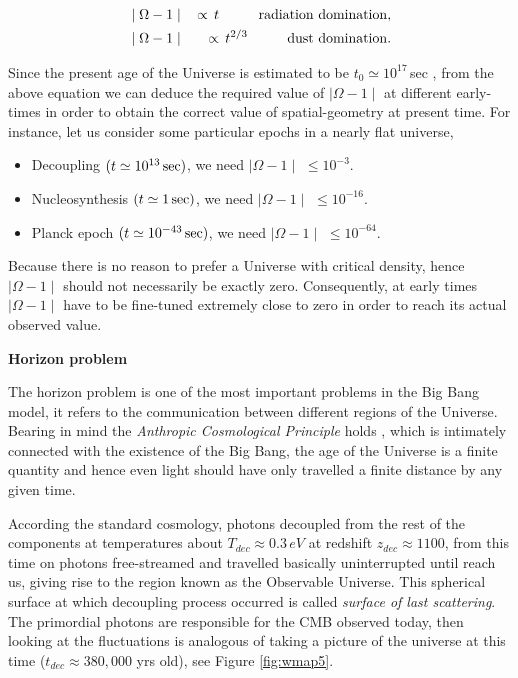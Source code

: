 \documentclass{rmaa}
\def\bea{\begin{eqnarray}}
\def\eea{\end{eqnarray}}
\begin{document}
\bea
&\mid \Omega-1\mid & \, \propto \, t  \hspace{1cm} {\rm radiation\,\, domination},\nonumber \\ 
&\mid \Omega-1\mid & \, \propto \, t^{2/3}  \hspace{1cm} {\rm dust\,\, domination}. \nonumber
\eea

\noindent
Since the present age of the Universe is estimated to be $t_0 \simeq 10^{17} 
\, $sec \citep{Larson}, from the above equation we can 
deduce the required value of $\mid \Omega-1\mid$ at different early-times in order to 
obtain the correct value of spatial-geometry at present time. For instance, let us consider some 
particular epochs in a nearly flat universe,

\begin{itemize}
\item Decoupling  $(t \simeq 10^{13}\, {\rm sec})$, we need $\mid \Omega-1 \mid$ $\le 10^{-3}$.
\item  Nucleosynthesis $(t \simeq 1\, {\rm sec})$, we need $\mid \Omega-1 \mid$ $\le 10^{-16}$.
\item  Planck epoch $(t \simeq 10^{-43}\, {\rm sec})$, we need $\mid \Omega-1 \mid$  $\le 10^{-64}$.
\end{itemize}
% 
%
Because there is no reason to prefer a Universe with critical density, hence
$\mid \Omega-1\mid$ should not necessarily be exactly zero. 
Consequently, at early times 
$\mid \Omega-1\mid$ have to be fine-tuned extremely close to zero in order to reach 
its actual observed value.



\vskip 16pt
\textbf{Horizon problem} 
\vskip 10pt

The horizon problem is one of the most important problems in the Big Bang model,
it refers to the communication between different regions of the Universe. 
%
Bearing in mind the \textit{Anthropic Cosmological Principle} holds 
\citep{Barrow, Coles}, which is intimately connected
with the existence of the Big Bang, the age of the Universe is a finite quantity and hence
even light should have only travelled a finite distance by any given time. 


According the standard cosmology, photons decoupled from the rest of the 
components at temperatures about $T_{dec}\approx 0.3\, eV$ at redshift
$z_{dec} \approx 1100$, from this time on photons free-streamed and travelled basically
 uninterrupted until reach us, giving rise to the region known as the Observable Universe.
 This spherical surface at which decoupling process occurred is called 
\textit{surface of last scattering}.
The primordial photons are responsible for the CMB observed today, then looking at the
fluctuations is analogous of taking a picture of the universe at this time 
($t_{dec}\approx 380,000$ yrs old), see Figure \ref{fig:wmap5}.
\end{document}
